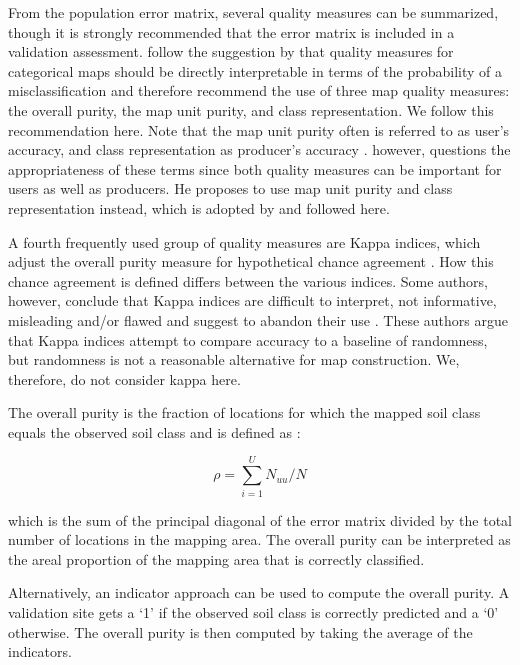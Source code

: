\documentclass[10pt,b5paper,]{book}
\theoremstyle{definition}
\theoremstyle{definition}
\theoremstyle{definition}
\theoremstyle{remark}
\begin{document}
From the population error matrix, several quality measures can be
summarized, though it is strongly recommended that the error matrix is
included in a validation assessment. \citet{brus2011sampling} follow the
suggestion by \citet{stehman1997selecting} that quality measures for
categorical maps should be directly interpretable in terms of the
probability of a misclassification and therefore recommend the use of
three map quality measures: the overall purity, the map unit purity, and
class representation. We follow this recommendation here. Note that the
map unit purity often is referred to as user's accuracy, and class
representation as producer's accuracy
\citep[\citet{adhikari2014constructing}]{stehman1997selecting}.
\citet{lark1995components} however, questions the appropriateness of
these terms since both quality measures can be important for users as
well as producers. He proposes to use map unit purity and class
representation instead, which is adopted by \citet{brus2011sampling} and
followed here.

A fourth frequently used group of quality measures are Kappa indices,
which adjust the overall purity measure for hypothetical chance
agreement \citep{stehman1997selecting}. How this chance agreement is
defined differs between the various indices. Some authors, however,
conclude that Kappa indices are difficult to interpret, not informative,
misleading and/or flawed and suggest to abandon their use
\citep{pontius2011death}. These authors argue that Kappa indices attempt
to compare accuracy to a baseline of randomness, but randomness is not a
reasonable alternative for map construction. We, therefore, do not
consider kappa here.

The overall purity is the fraction of locations for which the mapped
soil class equals the observed soil class and is defined as
\citep{brus2011sampling}:

\begin{equation}
\rho = \sum_{i=1}^{U} N_{uu} / N
\end{equation}

which is the sum of the principal diagonal of the error matrix divided
by the total number of locations in the mapping area. The overall purity
can be interpreted as the areal proportion of the mapping area that is
correctly classified.

Alternatively, an indicator approach can be used to compute the overall
purity. A validation site gets a `1' if the observed soil class is
correctly predicted and a `0' otherwise. The overall purity is then
computed by taking the average of the indicators.
\end{document}
